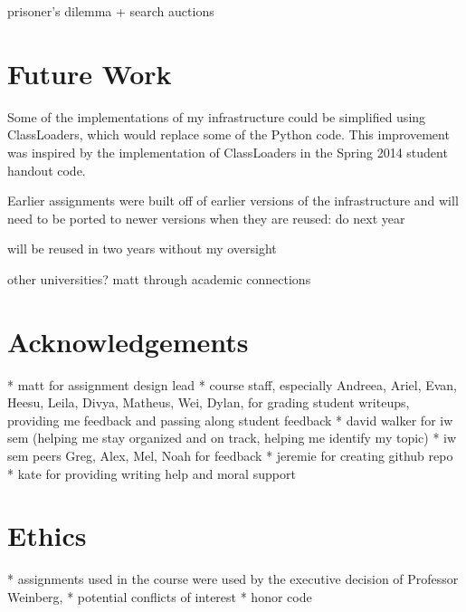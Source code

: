 \documentclass[pageno]{jpaper}
\begin{document}
prisoner's dilemma + search auctions



\section*{Future Work}

Some of the implementations of my infrastructure could be simplified using ClassLoaders, which would replace some of the Python code.
This improvement was inspired by the implementation of ClassLoaders in the Spring 2014 student handout code.

Earlier assignments were built off of earlier versions of the infrastructure and will need to be ported to newer versions when they are reused: do next year

will be reused in two years without my oversight

other universities? matt through academic connections

\section*{Acknowledgements}
* matt for assignment design lead
* course staff, especially Andreea, Ariel, Evan, Heesu, Leila, Divya, Matheus, Wei, Dylan, for grading student writeups, providing me feedback and passing along student feedback
* david walker for iw sem (helping me stay organized and on track, helping me identify my topic)
* iw sem peers Greg, Alex, Mel, Noah for feedback
* jeremie for creating github repo
* kate for providing writing help and moral support

\section*{Ethics}
* assignments used in the course were used by the executive decision of Professor Weinberg,
* potential conflicts of interest
* honor code
\end{document}
